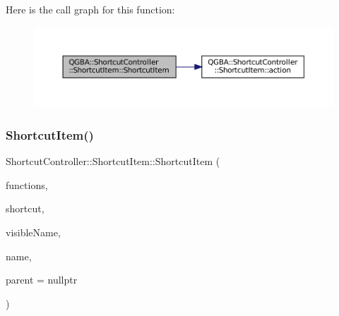 Here is the call graph for this function\+:
\nopagebreak
\begin{figure}[H]
\begin{center}
\leavevmode
\includegraphics[width=350pt]{class_q_g_b_a_1_1_shortcut_controller_1_1_shortcut_item_ae467c23c5169505c1c202879fef70aa4_cgraph}
\end{center}
\end{figure}
\mbox{\label{class_q_g_b_a_1_1_shortcut_controller_1_1_shortcut_item_a14ff3da67410ce65d8b773641f6578b1}} 
\subsubsection{\texorpdfstring{Shortcut\+Item()}{ShortcutItem()}\hspace{0.1cm}{\footnotesize\ttfamily [2/3]}}
{\footnotesize\ttfamily Shortcut\+Controller\+::\+Shortcut\+Item\+::\+Shortcut\+Item (\begin{DoxyParamCaption}\item[{\mbox{\hyperlink{class_q_g_b_a_1_1_shortcut_controller_1_1_shortcut_item_a28ffcf4fe5bf253d0d47e2357794ddf1}{Functions}}}]{functions,  }\item[{\mbox{\hyperlink{ioapi_8h_a787fa3cf048117ba7123753c1e74fcd6}{int}}}]{shortcut,  }\item[{const Q\+String \&}]{visible\+Name,  }\item[{const Q\+String \&}]{name,  }\item[{\mbox{\hyperlink{class_q_g_b_a_1_1_shortcut_controller_1_1_shortcut_item}{Shortcut\+Item}} $\ast$}]{parent = {\ttfamily nullptr} }\end{DoxyParamCaption})}

\mbox{\label{class_q_g_b_a_1_1_shortcut_controller_1_1_shortcut_item_a03996b0c88ebe736b86226562859c512}} 
